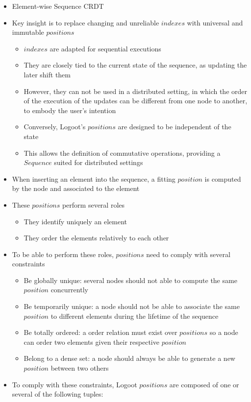 \documentclass{article}
\begin{document}
\begin{itemize}
    \item Element-wise Sequence \ac{CRDT}
    \item Key insight is to replace changing and unreliable $indexes$ with universal and immutable $positions$
    \begin{itemize}
        \item $indexes$ are adapted for sequential executions
        \item They are closely tied to the current state of the sequence, as updating the later shift them
        \item However, they can not be used in a distributed setting, in which the order of the execution of the updates can be different from one node to another, to embody the user's intention
        \item Conversely, Logoot's $positions$ are designed to be independent of the state
        \item This allows the definition of commutative operations, providing a $Sequence$ suited for distributed settings
    \end{itemize}


    \item When inserting an element into the sequence, a fitting $position$ is computed by the node and associated to the element
    \item These $positions$ perform several roles
    \begin{itemize}
        \item They identify uniquely an element
        \item They order the elements relatively to each other
    \end{itemize}
    \item To be able to perform these roles, $positions$ need to comply with several constraints
    \begin{itemize}
        \item Be globally unique: several nodes should not able to compute the same $position$ concurrently
        \item Be temporarily unique: a node should not be able to associate the same $position$ to different elements during the lifetime of the sequence
        \item Be totally ordered: a order relation must exist over $positions$ so a node can order two elements given their respective $position$
        \item Belong to a dense set: a node should always be able to generate a new $position$ between two others
    \end{itemize}
    \item To comply with these constraints, Logoot $positions$ are composed of one or several of the following tuples:


\end{itemize}
\end{document}
